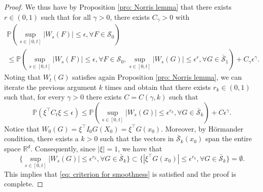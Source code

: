\documentclass[11pt,a4paper]{article}
\newcommand{\R}{\mathbb{R}}
\theoremstyle{plain}
\newtheorem{prop}[defn]{Proposition}
\begin{document}
\begin{proof}
    We thus have by Proposition \ref{pro: Norris lemma} that there exists $r\in(0,1)$ such that for all $\gamma > 0$, there exists $C_{\gamma} > 0$ with
    \begin{multline*}
         \mathbb{P}(\sup_{s\in [0,t]}|W_s(F)| \leq \epsilon , \forall F\in\mathcal{S}_0) \\ \leq 
        \mathbb{P}(\sup_{s\in [0,t]}|W_s(F)|  \leq \epsilon, \forall F\in\mathcal{S}_0,
        \sup_{s\in [0,t]}|W_s(G)| \leq \epsilon^r, \forall G\in \bar{\mathcal{S}}_1) + C_{\gamma}\epsilon^{\gamma}.
    \end{multline*}
    Noting that $W_t(G)$ satisfies again Proposition \ref{pro: Norris lemma}, we can iterate the previous argument $k$ times and obtain that there exists $r_k \in (0,1)$ such that, for every $\gamma >0$ there exists $C = C(\gamma,k)$ such that
    \begin{equation*}
        \mathbb{P} (\xi^{\top} C_t \xi \leq \epsilon)
        \leq \mathbb{P}(
         \sup_{s\in [0,t]}|W_s(G)| \leq \epsilon^{r_k}, \forall G \in \bar{\mathcal{S}}_k) + C \epsilon^{\gamma}.
    \end{equation*}
    Notice that $W_0(G) = \xi^{\top} I_0 G(X_0) = \xi^{\top} G(x_0)$. Moreover, by H\"ormander condition, there exists a $k>0$ such that the vectors in $\bar{\mathcal{S}}_k(x_0)$ span the entire space $\R^d$. Consequently, since $|\xi|=1$, we have that
    \begin{equation*}
        \{\sup_{s\in [0,t]}|W_s(G)| \leq \epsilon^{r_k}, \forall G \in \bar{\mathcal{S}}_k
        \}
        \subset
        \{|\xi^{\top} G(x_0)| \leq \epsilon^{r_k},
        \forall G\in \bar{\mathcal{S}}_k
        \}
        =\emptyset.
    \end{equation*}
    This implies that \eqref{eq: criterion for smoothness} is satisfied and the proof is complete.
\end{proof}












\end{document}
